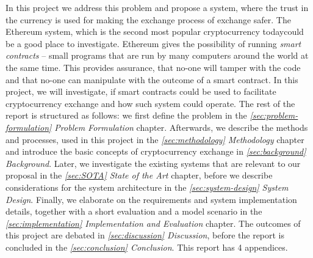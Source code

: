 In this project we address this problem and propose a system, where the trust in the currency is used for making the exchange process of exchange safer. The Ethereum system, which is the second most popular cryptocurrency today\footnotemark could be a good place to investigate. Ethereum gives the possibility of running \emph{smart contracts} -- small programs that are run by many computers around the world at the same time. This provides assurance, that no-one will tamper with the code and that no-one can manipulate with the outcome of a smart contract. 
% 
% 
In this project, we will investigate, if smart contracts could be used to facilitate cryptocurrency exchange and how such system could operate. The rest of the report is structured as follows: we first define the problem in the \textit{\ref{sec:problem-formulation} Problem Formulation} chapter. Afterwards, we describe the methods and processes, used in this project in the \textit{\ref{sec:methodology} Methodology} chapter and introduce the basic concepts of cryptocurrency exchange in \textit{\ref{sec:background} Background}. Later, we investigate the existing systems that are relevant to our proposal in the \textit{\ref{sec:SOTA} State of the Art} chapter, before we describe considerations for the system architecture in the \textit{\ref{sec:system-design} System Design}. Finally, we elaborate on the requirements and system implementation details, together with a short evaluation and a model scenario in the \textit{\ref{sec:implementation} Implementation and Evaluation} chapter. The outcomes of this project are debated in \textit{\ref{sec:discussion} Discussion}, before the report is concluded in the \textit{\ref{sec:conclusion} Conclusion}. This report has 4 appendices.